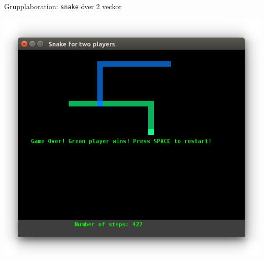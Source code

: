 

\ifkompendium\else





\begin{Slide}{Grupplaboration: \texttt{snake} över 2 veckor}
\begin{minipage}{0.6\textwidth}
\includegraphics[width=1.0\textwidth]{../img/snake-twoplayer}
\end{minipage}%
\begin{minipage}{0.4\textwidth}
\begin{itemize}

\end{itemize}
\end{minipage}%
\end{Slide}

